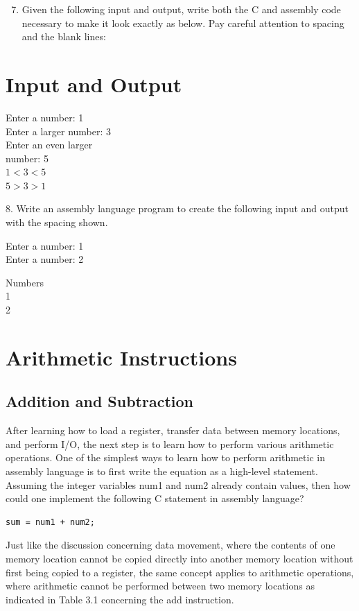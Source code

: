 \documentclass[10pt]{book}
\begin{document}
\begin{enumerate}
  \setcounter{enumi}{6}
  \item Given the following input and output, write both the C and assembly code necessary to make it look exactly as below. Pay careful attention to spacing and the blank lines:
\end{enumerate}

\section{Input and Output}
Enter a number: 1\\
Enter a larger number: 3\\
Enter an even larger\\
number: 5\\
$1<3<5$\\
$5>3>1$

8. Write an assembly language program to create the following input and output with the spacing shown.

Enter a number: 1\\
Enter a number: 2

Numbers\\
1\\
2

\section{Arithmetic Instructions}
\subsection{Addition and Subtraction}
After learning how to load a register, transfer data between memory locations, and perform I/O, the next step is to learn how to perform various arithmetic operations. One of the simplest ways to learn how to perform arithmetic in assembly language is to first write the equation as a high-level statement. Assuming the integer variables num1 and num2 already contain values, then how could one implement the following C statement in assembly language?
\begin{verbatim}
sum = num1 + num2;
\end{verbatim}

Just like the discussion concerning data movement, where the contents of one memory location cannot be copied directly into another memory location without first being copied to a register, the same concept applies to arithmetic operations, where arithmetic cannot be performed between two memory locations as indicated in Table 3.1 concerning the add instruction.
\end{document}
